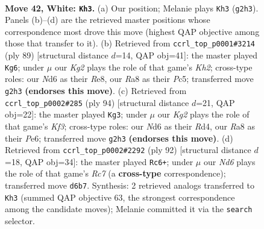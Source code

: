 \documentclass[11pt]{article}
\begin{document}
\clearpage

\begin{figure}[p]\centering
\begin{subfigure}{0.46\textwidth}\centering
\resizebox{\linewidth}{!}{%
\newchessgame
\chessboard[
  setfen={R7/6pk/3Npp2/1p5p/3P1P1P/1r2P1P1/6K1/8 w - - 4 42},
  showmover=false,
  pgfstyle=straightmove, color=movearrow, markmove={g2-h3}
]}
\caption{}
\end{subfigure}\hfill
\begin{subfigure}{0.46\textwidth}\centering
\resizebox{\linewidth}{!}{%
\newchessgame
\chessboard[
  setfen={4r3/6pk/1p1RPp1p/p1p5/P5P1/1P5P/6K1/8 b - - 2 45},
  showmover=false,
  pgfstyle=straightmove, color=movearrow, markmove={h7-g6}
]}
\caption{}
\end{subfigure}
\\[4pt]
\begin{subfigure}{0.46\textwidth}\centering
\resizebox{\linewidth}{!}{%
\newchessgame
\chessboard[
  setfen={4k3/4p3/4Pp1p/5P1P/1p1R2P1/p4K2/Pr6/8 w - - 4 48},
  showmover=false,
  pgfstyle=straightmove, color=movearrow, markmove={f3-g3}
]}
\caption{}
\end{subfigure}\hfill
\begin{subfigure}{0.46\textwidth}\centering
\resizebox{\linewidth}{!}{%
\newchessgame
\chessboard[
  setfen={8/p1R5/6k1/4p2p/1p2P1p1/1P1PK1P1/r6P/8 w - - 8 47},
  showmover=false,
  pgfstyle=straightmove, color=movearrow, markmove={c7-c6}
]}
\caption{}
\end{subfigure}
\caption{\textbf{Move 42, White: \texttt{Kh3}.} (a) Our position; Melanie plays \texttt{Kh3} (\texttt{g2h3}). Panels (b)--(d) are the retrieved master positions whose correspondence most drove this move (highest QAP objective among those that transfer to it). (b) Retrieved from \texttt{ccrl\_top\_p0001\#3214} (ply 89) [structural distance $d$=14, QAP obj=41]: the master played \texttt{Kg6}; under $\mu$ our \emph{Kg2} plays the role of that game's \emph{Kh2}; cross-type roles: our \emph{N}d6 as their \emph{R}e8, our \emph{R}a8 as their \emph{P}c5; transferred move \texttt{g2h3} \textbf{(endorses this move)}. (c) Retrieved from \texttt{ccrl\_top\_p0002\#285} (ply 94) [structural distance $d$=21, QAP obj=22]: the master played \texttt{Kg3}; under $\mu$ our \emph{Kg2} plays the role of that game's \emph{Kf3}; cross-type roles: our \emph{N}d6 as their \emph{R}d4, our \emph{R}a8 as their \emph{P}e6; transferred move \texttt{g2h3} \textbf{(endorses this move)}. (d) Retrieved from \texttt{ccrl\_top\_p0002\#2292} (ply 92) [structural distance $d$=18, QAP obj=34]: the master played \texttt{Rc6+}; under $\mu$ our \emph{Nd6} plays the role of that game's \emph{Rc7} (a \textbf{cross-type} correspondence); transferred move \texttt{d6b7}. Synthesis: 2 retrieved analogs transferred to \texttt{Kh3} (summed QAP objective 63, the strongest correspondence among the candidate moves); Melanie committed it via the \texttt{search} selector.}
\label{fig:thought-m82}
\end{figure}
\end{document}
